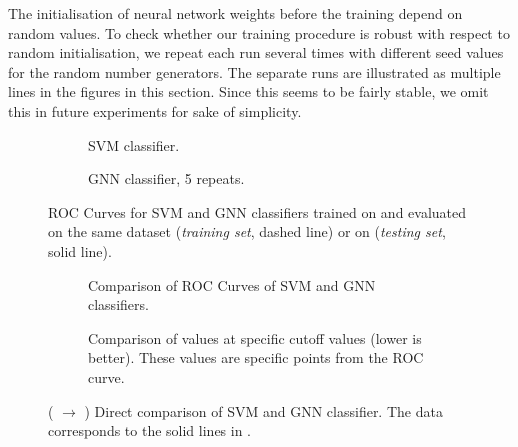 \documentclass[
	fontsize=10pt, %
	twoside=false, %
	secnumdepth=1, %
  toc=indentunnumbered %
]{kaobook}
\begin{document}
The initialisation of neural network weights before the training depend on
random values. To check whether our training procedure is robust with respect to random
initialisation, we repeat each run several times with different seed values for
the random number generators. The separate runs are illustrated as multiple
lines in the figures in this section. Since this seems to be fairly stable, we omit this
in future experiments for sake of simplicity.

\begin{figure}[h]
  \centering
  \begin{subfigure}[h]{0.49\linewidth}
    \caption{SVM classifier.}
  \end{subfigure}
  \begin{subfigure}[h]{0.49\linewidth}
    \caption{GNN classifier, 5 repeats.  }
  \end{subfigure}
  \caption{ROC Curves for SVM and GNN classifiers trained on \ADMap{}
    and evaluated on the same dataset (\textit{training set}, dashed line) or on \PDMap
    (\textit{testing set}, solid line).}
  \label{fig:svm-repro-comparison}
\end{figure}
%
\begin{figure}[h]
  \centering
  \begin{subfigure}[h]{0.49\linewidth}
    \caption{Comparison of ROC Curves of SVM and GNN classifiers.}
  \end{subfigure}
  \begin{subfigure}[h]{0.49\linewidth}
    \caption{Comparison of \FPR values at specific \TPR cutoff values (lower is better). These
      values are specific points from the ROC curve.}
  \end{subfigure}
  \caption{(\ADMap{} $\rightarrow$ \PDMap) Direct comparison of SVM and GNN classifier. The data
    corresponds to the solid lines in .}
  \label{fig:svm-repro-roc-train-test}
\end{figure}

\end{document}
